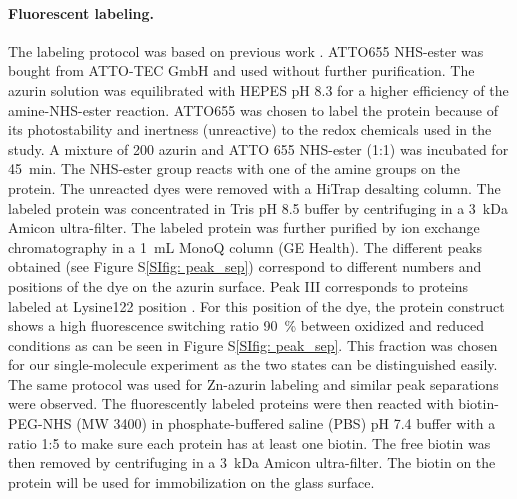 \documentclass[journal=jacsat,manuscript=article]{achemso}
\begin{document}
\paragraph*{Fluorescent labeling.}
The labeling protocol was based on previous work \cite{nicolardi2012topdown}.
ATTO655 NHS-ester was bought from ATTO-TEC GmbH and used without further purification.
The azurin solution was equilibrated with HEPES pH 8.3 for a higher efficiency of the amine-NHS-ester reaction.
ATTO655 was chosen to label the protein because of its photostability and inertness (unreactive) to the redox chemicals used in the study.
A mixture of \SI{200}{\uM} azurin and ATTO 655 NHS-ester (1:1) was incubated for \SI{45}{\minute}.
The NHS-ester group reacts with one of the amine groups on the protein.
The unreacted dyes were removed with a HiTrap desalting column.
The labeled protein was concentrated in Tris pH 8.5 buffer by centrifuging in a \SI{3}{ kDa} Amicon ultra-filter.
The labeled protein was further purified by ion exchange chromatography in a \SI{1}{\mL} MonoQ column (GE Health).
The different peaks obtained (see Figure S\ref{SIfig: peak_sep}) correspond to different numbers and positions of the dye on the azurin surface. 
Peak III corresponds to proteins labeled at Lysine122 position \cite{nicolardi2012topdown}.
For this position of the dye, the protein construct shows a high fluorescence switching ratio \SI{90}{\percent} between oxidized and reduced conditions as can be seen in Figure S\ref{SIfig: peak_sep}. This fraction was chosen for our single-molecule experiment as the two states can be distinguished easily.
The same protocol was used for Zn-azurin labeling and similar peak separations were observed.
The fluorescently labeled proteins were then reacted with biotin-PEG-NHS (MW 3400) in phosphate-buffered saline (PBS) pH 7.4 buffer with a ratio 1:5 to make sure each protein has at least one biotin.
The free biotin was then removed by centrifuging in a \SI{3}{ kDa} Amicon ultra-filter.
The biotin on the protein will be used for immobilization on the glass surface.
\end{document}
